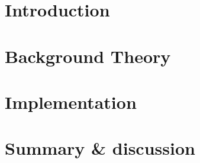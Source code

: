 \documentclass[11pt,a4paper,bibtotoc,idxtotoc,headsepline,footsepline,footexclude,DIV13,oneside]{scrbook}
\begin{document}
	\frontmatter
	
	
%	
%	
	
	
%	
	
	
	
	
	
	
	
	
	\listoftodos
	\tableofcontents
   	

	\mainmatter
	
	
		\chapter{Introduction}
		\label{chapter:Introduction}
		
		
		
		\chapter{Background Theory}
		\label{chapter:Background}
		
		
		
		\chapter{Implementation}
		\label{chapter:Implementation}		
		
		
		\chapter{Summary \& discussion}
		\label{chapter:Discussion}		
		
		
\end{document}

